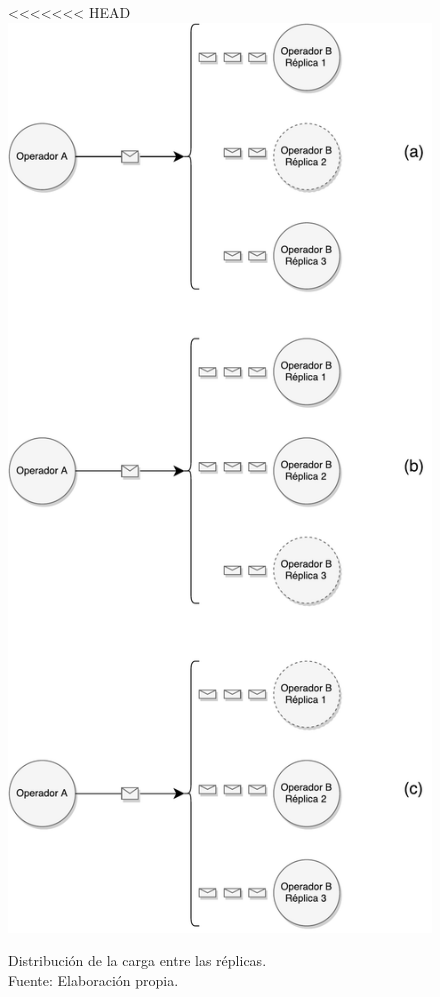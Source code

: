 \begin{figure}[!ht]
	\centering
<<<<<<< HEAD
	\captionsetup{justification=centering}
	\includegraphics[scale=0.4]{images/DistribucionCarga.pdf}
	\caption[Distribución de la carga entre las réplicas.]{Distribución de la carga entre las réplicas.\\Fuente: Elaboración propia.}

\end{figure}
